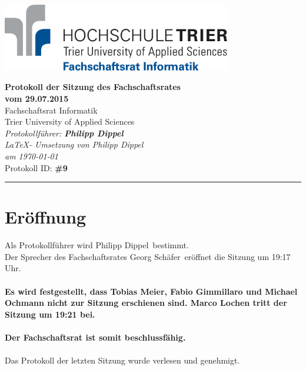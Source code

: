 \documentclass[a4paper, 11pt]{article} %
\newcounter{summe}
\newcommand{\abstimmung}[4]{
	\setcounter{summe}{#3}
	\addtocounter{summe}{#4}
	\begin{flushleft}
		#1\\
	Es wird über den Antrag abgestimmt.
	\end{flushleft}
	\ifthenelse{\equal{#3}{0}\AND\equal{#4}{0}}{
	\begin{center}
		\textbf{Der Antrag wird einstimmig angenommen.}
	\end{center}
	}{
	\begin{center}
		#2 \ifthenelse{\equal{#2}{1}}{Stimme}{Stimmen} dafür, #3 \ifthenelse{\equal{#3}{1}}{Stimme}{Stimmen} dagegen, #4 \ifthenelse{\equal{#42}{1}}{Enthaltung}{Enthaltungen}\\
		\ifthenelse{#2>\value{summe}}{
		\textbf{Der Antrag ist somit angenommen.}
		}{
		\textbf{Der Antrag ist somit abgelehnt.}
		}
	\end{center}
	}  
}
\newcommand{\protokoller}{Philipp Dippel}
\newcommand{\dateOfMeeting}{29.07.2015}
\newcommand{\TeXer}{Philipp Dippel}
\newcommand{\fsiPresident}{Georg Schäfer}
\newcommand{\protocolID}{9}
\begin{document}

\doublespacing
\thispagestyle{empty}

\begin{center}
\includegraphics[width=10.0cm]{../logo_fsi.eps}

\vspace*{\fill}
{\LARGE \textbf{Protokoll der Sitzung des Fachschaftsrates \\vom \dateOfMeeting}}\\
Fachschaftsrat Informatik\\
Trier University of Applied Sciences\\
\vspace{2.5cm}
\textit{
	Protokollführer: \textbf{\protokoller} \\
	\LaTeX - Umsetzung von \TeXer\\
	am \today\\
}
Protokoll ID: \textbf{\#\protocolID}
\vfill
\end{center}

\hspace*{-35cm}
\textcolor{fsi}{\rule{64.9cm}{15pt}}
\pagebreak
 
\setcounter{tocdepth}{2}
\tableofcontents 
\pagebreak

\section{Eröffnung}
Als Protokollführer wird \protokoller~bestimmt.\\
Der Sprecher des Fachschaftsrates \fsiPresident~eröffnet die Sitzung um 19:17 Uhr.
\\\\
\textbf{Es wird festgestellt, dass Tobias Meier, Fabio Gimmillaro und Michael Ochmann nicht zur Sitzung erschienen sind. Marco Lochen tritt der Sitzung um 19:21 bei.}
\\\\
\textbf{Der Fachschaftsrat ist somit beschlussfähig.}
\\\\
Das Protokoll der letzten Sitzung wurde verlesen und genehmigt.

\end{document}
